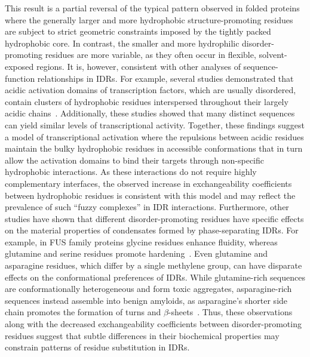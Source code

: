 This result is a partial reversal of the typical pattern observed in folded proteins where the generally larger and more hydrophobic structure-promoting residues are subject to strict geometric constraints imposed by the tightly packed hydrophobic core. In contrast, the smaller and more hydrophilic disorder-promoting residues are more variable, as they often occur in flexible, solvent-exposed regions. It is, however, consistent with other analyses of sequence-function relationships in IDRs. For example, several studies demonstrated that acidic activation domains of transcription factors, which are usually disordered, contain clusters of hydrophobic residues interspersed throughout their largely acidic chains~\cite{Ravarani2018, Staller2018, Erijman2020}. Additionally, these studies showed that many distinct sequences can yield similar levels of transcriptional activity. Together, these findings suggest a model of transcriptional activation where the repulsions between acidic residues maintain the bulky hydrophobic residues in accessible conformations that in turn allow the activation domains to bind their targets through non-specific hydrophobic interactions. As these interactions do not require highly complementary interfaces, the observed increase in exchangeability coefficients between hydrophobic residues is consistent with this model and may reflect the prevalence of such ``fuzzy complexes'' in IDR interactions. Furthermore, other studies have shown that different disorder-promoting residues have specific effects on the material properties of condensates formed by phase-separating IDRs. For example, in FUS family proteins glycine residues enhance fluidity, whereas glutamine and serine residues promote hardening~\cite{Wang2018}. Even glutamine and asparagine residues, which differ by a single methylene group, can have disparate effects on the conformational preferences of IDRs. While glutamine-rich sequences are conformationally heterogeneous and form toxic aggregates, asparagine-rich sequences instead assemble into benign amyloids, as asparagine's shorter side chain promotes the formation of turns and $\beta$-sheets~\cite{Halfmann2011}. Thus, these observations along with the decreased exchangeability coefficients between disorder-promoting residues suggest that subtle differences in their biochemical properties may constrain patterns of residue substitution in IDRs.

